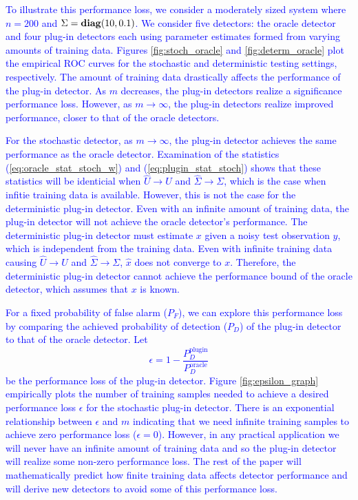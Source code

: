 \textcolor{blue}{To illustrate this performance loss, we consider a moderately sized system where $n=200$ and $\Sigma=\mathop{\bf diag}(10,0.1)$. We consider five detectors: the oracle detector and four plug-in detectors each using parameter estimates formed from varying amounts of training data. Figures \ref{fig:stoch_oracle} and \ref{fig:determ_oracle} plot the empirical ROC curves for the stochastic and deterministic testing settings, respectively. The amount of training data drastically affects the performance of the plug-in detector. As $m$ decreases, the plug-in detectors realize a significance performance loss. However, as $m\to\infty$, the plug-in detectors realize improved performance, closer to that of the oracle detectors.}

\textcolor{blue}{For the stochastic detector, as $m\to\infty$, the plug-in detector achieves the same performance as the oracle detector. Examination of the statistics (\ref{eq:oracle_stat_stoch_w}) and (\ref{eq:plugin_stat_stoch}) shows that these statistics will be identicial when $\widehat{U}\to U$ and $\widehat{\Sigma}\to\Sigma$, which is the case when infitie training data is available. However, this is not the case for the deterministic plug-in detector. Even with an infinite amount of training data, the plug-in detector will not achieve the oracle detector's performance. The deterministic plug-in detector must estimate $x$ given a noisy test observation $y$, which is independent from the training data. Even with infinite training data causing $\widehat{U}\to U$ and $\widehat{\Sigma}\to\Sigma$, $\widehat{x}$ does not converge to $x$. Therefore, the deterministic plug-in detector cannot achieve the performance bound of the oracle detector, which assumes that $x$ is known.}

\textcolor{blue}{For a fixed probability of false alarm ($P_F$), we can explore this performance loss by comparing the achieved probability of detection ($P_D$) of the plug-in detector to that of the oracle detector. Let
\begin{equation}\label{eq:epsilon}
\epsilon = 1 - \frac{P_D^{\text{plugin}}}{P_D^{\text{oracle}}}
\end{equation}
be the performance loss of the plug-in detector. Figure \ref{fig:epsilon_graph} empirically plots the number of training samples needed to achieve a desired performance loss $\epsilon$ for the stochastic plug-in detector. There is an exponential relationship between $\epsilon$ and $m$ indicating that we need infinite training samples to achieve zero performance loss ($\epsilon=0$). However, in any practical application we will never have an infinite amount of training data and so the plug-in detector will realize some non-zero performance loss. The rest of the paper will mathematically predict how finite training data affects detector performance and will derive new detectors to avoid some of this performance loss.}

